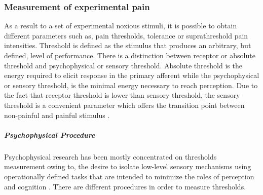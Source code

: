 
\subsubsection{Measurement of experimental pain}
As a result to a set of experimental noxious stimuli, it is possible to obtain different parameters such as, pain thresholds, tolerance or suprathreshold pain intensities. Threshold is defined as the stimulus that produces an arbitrary, but defined, level of performance. There is a distinction between receptor or absolute threshold and psychophysical or sensory threshold. Absolute threshold is the energy required to elicit response in the primary afferent while the psychophysical or sensory threshold, is the minimal energy necessary to reach perception. Due to the fact that receptor threshold is lower than sensory threshold, the sensory threshold is a convenient parameter which offers the transition point between non-painful and painful stimulus \cite{neurop_exam}.
\subparagraph{Psychophysical Procedure}
Psychophysical research has been mostly concentrated on thresholds measurement owing to, the desire to isolate low-level sensory mechanisms using operationally defined tasks that are intended to minimize the roles of perception and cognition \cite{psy_methods}. There are different procedures in order to measure thresholds.


